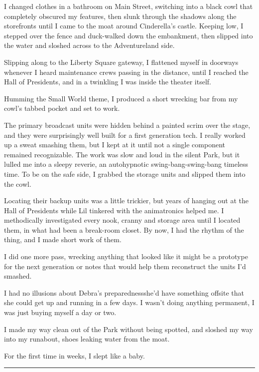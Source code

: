 I changed clothes in a bathroom on Main Street, switching into a
black cowl that completely obscured my features, then slunk through
the shadows along the storefronts until I came to the moat around
Cinderella's castle. Keeping low, I stepped over the fence and
duck-walked down the embankment, then slipped into the water and
sloshed across to the Adventureland side.

Slipping along to the Liberty Square gateway, I flattened myself in
doorways whenever I heard maintenance crews passing in the
distance, until I reached the Hall of Presidents, and in a
twinkling I was inside the theater itself.

Humming the Small World theme, I produced a short wrecking bar from
my cowl's tabbed pocket and set to work.

The primary broadcast units were hidden behind a painted scrim over
the stage, and they were surprisingly well built for a first
generation tech. I really worked up a sweat smashing them, but I
kept at it until not a single component remained recognizable. The
work was slow and loud in the silent Park, but it lulled me into a
sleepy reverie, an autohypnotic swing-bang-swing-bang timeless
time. To be on the safe side, I grabbed the storage units and
slipped them into the cowl.

Locating their backup units was a little trickier, but years of
hanging out at the Hall of Presidents while Lil tinkered with the
animatronics helped me. I methodically investigated every nook,
cranny and storage area until I located them, in what had been a
break-room closet. By now, I had the rhythm of the thing, and I
made short work of them.

I did one more pass, wrecking anything that looked like it might be
a prototype for the next generation or notes that would help them
reconstruct the units I'd smashed.

I had no illusions about Debra's preparedness{\dash}she'd have something
offsite that she could get up and running in a few days. I wasn't
doing anything permanent, I was just buying myself a day or two.

I made my way clean out of the Park without being spotted, and
sloshed my way into my runabout, shoes leaking water from the
moat.

For the first time in weeks, I slept like a baby.

\begin{center}\rule{1in}{0.4pt}\end{center}

